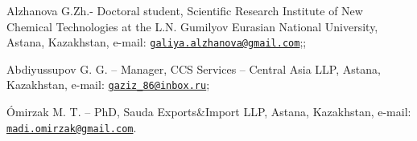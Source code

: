 \begin{authorinfo}
Alzhanova G.Zh.- Doctoral student, Scientific Research Institute of New
Chemical Technologies at the L.N. Gumilyov Eurasian National University,
Astana, Kazakhstan, e-mail:
\href{mailto:galiya.alzhanova@gmail.com}{\nolinkurl{galiya.alzhanova@gmail.com}};;

Abdiyussupov G. G. -- Manager, CCS Services -- Central Asia LLP, Astana,
Kazakhstan, e-mail:
\href{mailto:gaziz_86@inbox.ru}{\nolinkurl{gaziz\_86@inbox.ru}};

Ómirzak M. T. -- PhD, Sauda Exports\&Import LLP, Astana, Kazakhstan,
e-mail:
\href{mailto:madi.omirzak@gmail.com}{\nolinkurl{madi.omirzak@gmail.com}}.
\end{authorinfo}
